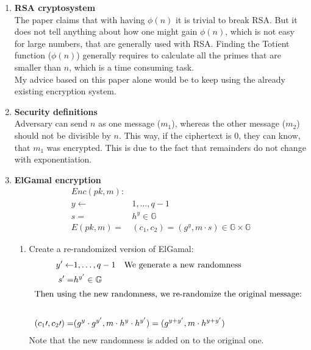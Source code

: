 \documentclass{article}
\begin{document}
	\homeworktitle
	
	\begin{enumerate}[label=\textbf{Task \arabic*:}]
		\item \textbf{RSA cryptosystem}\\
		The paper claims that with having $\phi(n)$ it is trivial to break RSA. But it does not tell anything about how one might gain $\phi(n)$, which is not easy for large numbers, that are generally used with RSA. Finding the Totient function ($\phi(n)$) generally requires to calculate all the primes that are smaller than $n$, which is a time consuming task.\\
		My advice based on this paper alone would be to keep using the already existing encryption system.
		\item \textbf{Security definitions}\\
		Adversary can send $n$ as one message ($m_1$), whereas the other message ($m_2$) should not be divisible by $n$. This way, if the ciphertext is $0$, they can know, that $m_1$ was encrypted. This is due to the fact that remainders do not change with exponentiation.
		\item \textbf{ElGamal encryption}
			\begin{align*}
				Enc(pk, m): &\\
				y \leftarrow & {1, \ldots , q-1}\\
				s = & h^y \in \mathbb{G}\\
				E(pk, m) = & (c_1, c_2) = (g^y, m \cdot s) \in \mathbb{G} \times \mathbb{G}
			\end{align*}
		\begin{enumerate}[label=\textit{Part \roman*}]
			\item Create a re-randomized version of ElGamal:
			\begin{align*}
				y' \leftarrow & {1, \ldots , q-1} \quad \text{We generate a new randomness}\\
				s' = & h^{y'} \in \mathbb{G}\\
				\intertext{Then using the new randomness, we re-randomize the original message:}\\
				(c_{1}\prime, c_{2}\prime) = & (g^y \cdot g^{y'}, m \cdot h^y \cdot h^{y'}) = (g^{y+y'}, m \cdot h^{y+y'})
			\end{align*}
			Note that the new randomness is added on to the original one. 

\end{enumerate}
\end{enumerate}
\end{document}
